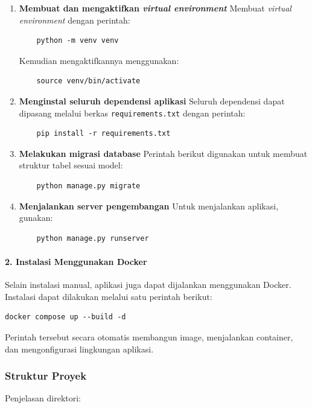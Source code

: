 \begin{enumerate}
    \item \textbf{Membuat dan mengaktifkan \textit{virtual environment}}  
    Membuat \textit{virtual environment} dengan perintah:  
    \begin{verbatim}
    python -m venv venv
    \end{verbatim}
    Kemudian mengaktifkannya menggunakan:  
    \begin{verbatim}
    source venv/bin/activate
    \end{verbatim}

    \item \textbf{Menginstal seluruh dependensi aplikasi}  
    Seluruh dependensi dapat dipasang melalui berkas \texttt{requirements.txt} dengan perintah:  
    \begin{verbatim}
    pip install -r requirements.txt
    \end{verbatim}

    \item \textbf{Melakukan migrasi database}  
    Perintah berikut digunakan untuk membuat struktur tabel sesuai model:  
    \begin{verbatim}
    python manage.py migrate
    \end{verbatim}

    \item \textbf{Menjalankan server pengembangan}  
    Untuk menjalankan aplikasi, gunakan:  
    \begin{verbatim}
    python manage.py runserver
    \end{verbatim}
\end{enumerate}

\paragraph{2. Instalasi Menggunakan Docker}
Selain instalasi manual, aplikasi juga dapat dijalankan menggunakan Docker. Instalasi dapat dilakukan melalui satu perintah berikut:

\begin{verbatim}
docker compose up --build -d
\end{verbatim}

Perintah tersebut secara otomatis membangun image, menjalankan container, dan mengonfigurasi lingkungan aplikasi.

\subsubsection{Struktur Proyek}
Penjelasan direktori:

